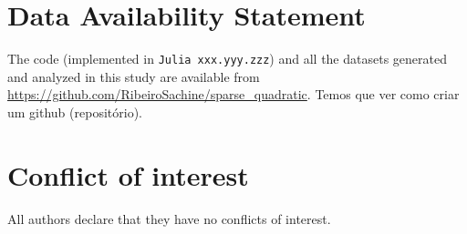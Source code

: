 \documentclass[smallextended,referee,envcountsect]{svjour3}
\newcommand{\rmv}[1]{{\color{red} #1}} %
\begin{document}
\section*{Data Availability Statement}
The code (implemented in \texttt{Julia xxx.yyy.zzz}) and all the datasets generated 
and analyzed in this study are available from 
\url{https://github.com/RibeiroSachine/sparse_quadratic}.
\rmv{Temos que ver como criar um github (repositório).}


\section*{Conflict of interest}
All authors declare that they have no conflicts of interest.



 
%  
\end{document}
